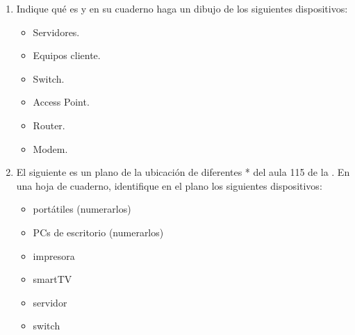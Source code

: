 \documentclass[letterpaper,10pt,spanish]{sphinxmanual}
\begin{document}
\begin{enumerate}
\begin{itemize}
\item {} 
\sphinxAtStartPar
A la página web de la institución educativa John F. Kennedy solo se puede acceder desde la INTRANET. \_\_\_

\item {} 
\sphinxAtStartPar
La INTRANET del portal del aula 115 se puede acceder desde cualquier lugar del mundo. \_\_\_

\end{itemize}

\item {} 
\sphinxAtStartPar
Indique qué es y en su cuaderno haga un dibujo de los siguientes dispositivos:
\begin{itemize}
\item {} 
\sphinxAtStartPar
Servidores.

\item {} 
\sphinxAtStartPar
Equipos cliente.

\item {} 
\sphinxAtStartPar
Switch.

\item {} 
\sphinxAtStartPar
Access Point.

\item {} 
\sphinxAtStartPar
Router.

\item {} 
\sphinxAtStartPar
Modem.

\end{itemize}

\item {} 
\sphinxAtStartPar
El siguiente es un plano de la ubicación de diferentes * del aula 115 de la . En una hoja de cuaderno, identifique en el plano los siguientes dispositivos:
\begin{itemize}
\item {} 
 portátiles (numerarlos)

\item {} 
 PCs de escritorio (numerarlos)

\item {} 
 impresora

\item {} 
 smart\sphinxhyphen{}TV

\item {} 
 servidor

\item {} 
 switch


\end{itemize}
\end{enumerate}
\end{document}
